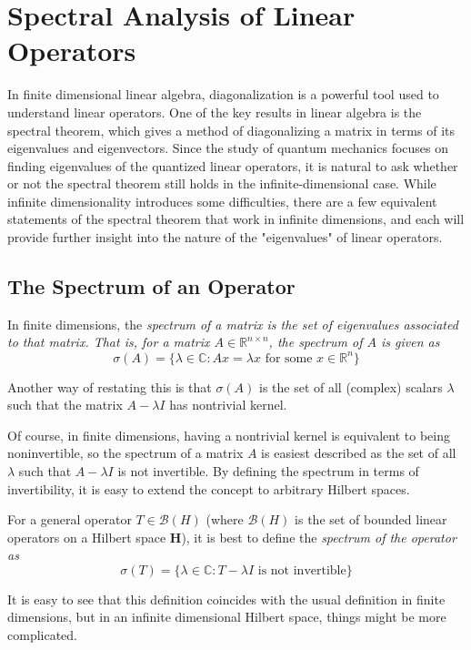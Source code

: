 \section{Spectral Analysis of Linear Operators}
In finite dimensional linear algebra, diagonalization is a powerful tool used to
understand linear operators. One of the key results in linear algebra is the
spectral theorem, which gives a method of diagonalizing a matrix in terms of its
eigenvalues and eigenvectors. Since the study of quantum mechanics focuses on
finding eigenvalues of the quantized linear operators, it is natural to ask
whether or not the spectral theorem still holds in the infinite-dimensional
case. While infinite dimensionality introduces some difficulties, there are a
few equivalent statements of the spectral theorem that work in infinite
dimensions, and each will provide further insight into the nature of the
"eigenvalues" of linear operators.

\subsection{The Spectrum of an Operator}
In finite dimensions, the \em spectrum \em of a matrix is the set of eigenvalues
associated to that matrix. That is, for a matrix $A \in \mathbb{R}^{n\times n}$,
the spectrum of $A$ is given as
\[
    \sigma(A) = \{\lambda \in \mathbb{C} : Ax=\lambda x \text{ for some } x \in
    \mathbb{R}^{n}\}
\]

Another way of restating this is that $\sigma(A)$ is the set of all (complex)
scalars $\lambda$ such that the matrix $A-\lambda I$ has nontrivial kernel.

Of course, in finite dimensions, having a nontrivial kernel is equivalent to
being noninvertible, so the spectrum of a matrix $A$ is easiest described as the
set of all $\lambda$ such that $A-\lambda I$ is not invertible. By defining the
spectrum in terms of invertibility, it is easy to extend the concept to
arbitrary Hilbert spaces.

For a general operator $T \in \mathscr{B}(H)$ (where $\mathscr{B}(H)$ is the set
of bounded linear operators on a Hilbert space \textbf{H}), it is best to define
the \em spectrum \em of the operator as
\[
    \sigma (T) = \{\lambda \in \mathbb{C} : T-\lambda I \text{ is not
    invertible}\}\]

It is easy to see that this definition coincides with the usual definition in
finite dimensions, but in an infinite dimensional Hilbert space, things might be
more complicated.

